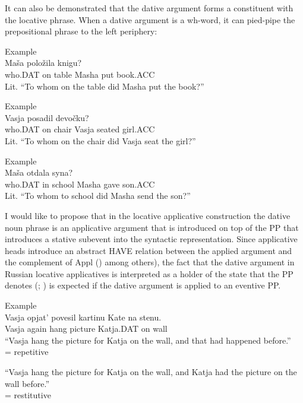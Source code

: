 \documentclass[output=paper,modfonts,nonflat,
 hidelinks
]{langsci/langscibook}
\begin{document}
It can also be demonstrated that the dative argument forms a constituent with the locative phrase. When a dative argument is a wh-word, it can pied-pipe the prepositional phrase to the left periphery:


 \ea\label{ex:bondarenko:}
{Example}\\

 Maša položila knigu?\\
     who.DAT on table Masha put book.ACC\\
\glt Lit. “To whom on the table did Masha put the book?”
\z

 \ea\label{ex:bondarenko:}
{Example}\\

 Vasja posadil devočku?\\
     who.DAT on chair Vasja seated girl.ACC\\
\glt Lit. “To whom on the chair did Vasja seat the girl?”
\z

 \ea\label{ex:bondarenko:}
{Example}\\

 Maša otdala syna?\\
     who.DAT in school Masha gave son.ACC\\
\glt Lit. “To whom to school did Masha send the son?”
\z


I would like to propose that in the locative applicative construction the dative noun phrase is an applicative argument that is introduced on top of the PP that introduces a stative subevent into the syntactic representation. Since applicative heads introduce an abstract HAVE relation between the applied argument and the complement of Appl (\citealt{Cuervo2003,McIntyre2006}) among others), the fact that the dative argument in Russian locative applicatives is interpreted as a holder of the state that the PP denotes (; ) is expected if the dative argument is applied to an eventive PP.


 \ea\label{ex:bondarenko:}
{Example}\\

\gll Vasja opjat’ povesil kartinu Kate na stenu.\\
     Vasja again hang picture Katja.DAT on wall\\
\ea “Vasja hang the picture for Katja on the wall, and that had   happened before.”\\
= {repetitive}

\ex “Vasja hang the picture for Katja on the wall, and Katja had the   picture on the wall before.”\\
= {restitutive}
\z
\z
\end{document}
